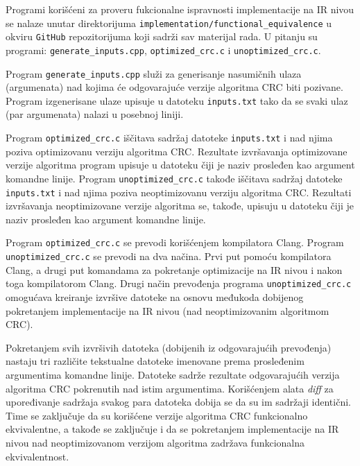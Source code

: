 \documentclass[12pt,oneside]{memoir}
\begin{document}

Programi korišćeni za proveru fukcionalne ispravnosti implementacije na IR nivou se nalaze unutar direktorijuma \texttt{implementation/functional\_equivalence} u okviru \texttt{GitHub} repozitorijuma koji sadrži sav materijal rada. U pitanju su programi:
\texttt{generate\_inputs.cpp}, \texttt{optimized\_crc.c} i \texttt{unoptimized\_crc.c}. 

Program \texttt{generate\_inputs.cpp} služi za generisanje nasumičnih ulaza (argumenata) nad kojima će odgovarajuće verzije algoritma CRC biti pozivane. Program izgenerisane ulaze upisuje u datoteku \texttt{inputs.txt} tako da se svaki ulaz (par argumenata) nalazi u posebnoj liniji. 

Program \texttt{optimized\_crc.c} iščitava sadržaj datoteke \texttt{inputs.txt} i nad njima poziva optimizovanu verziju algoritma CRC. Rezultate izvršavanja optimizovane verzije algoritma program upisuje u datoteku čiji je naziv prosleđen kao argument komandne linije. Program \texttt{unoptimized\_crc.c} takođe iščitava sadržaj datoteke \texttt{inputs.txt} i nad njima poziva neoptimizovanu verziju algoritma CRC. Rezultati izvršavanja neoptimizovane verzije algoritma se, takođe, upisuju u datoteku čiji je naziv prosleđen kao argument komandne linije. 

Program \texttt{optimized\_crc.c} se prevodi korišćenjem kompilatora Clang. Program \texttt{unoptimized\_crc.c} se prevodi na dva načina. Prvi put pomoću kompilatora Clang, a drugi put komandama za pokretanje optimizacije na IR nivou i nakon toga kompilatorom Clang. Drugi način prevođenja programa \texttt{unoptimized\_crc.c} omogućava kreiranje izvršive datoteke na osnovu međukoda dobijenog pokretanjem implementacije na IR nivou (nad neoptimizovanim algoritmom CRC).

Pokretanjem svih izvršivih datoteka (dobijenih iz odgovarajućih prevođenja) nastaju tri različite tekstualne datoteke imenovane prema prosleđenim argumentima komandne linije. Datoteke sadrže rezultate odgovarajućih verzija algoritma CRC pokrenutih nad istim argumentima. Korišćenjem alata \textit{diff} za upoređivanje sadržaja svakog para datoteka dobija se da su im sadržaji identični. Time se zaključuje da su korišćene verzije algoritma CRC funkcionalno ekvivalentne, a takođe se zaključuje i da se pokretanjem implementacije na IR nivou nad neoptimizovanom verzijom algoritma zadržava funkcionalna ekvivalentnost.
\end{document}
